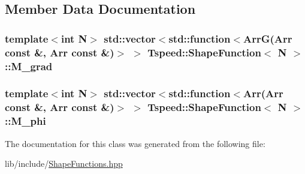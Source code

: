 \subsection{Member Data Documentation}
\hypertarget{classTspeed_1_1ShapeFunction_a282cf4ac589829f07a6c24e443d7bd05}{
\subsubsection[{M\-\_\-grad}]{\setlength{\rightskip}{0pt plus 5cm}template$<$int N$>$ std\-::vector$<$std\-::function$<$Arr\-G(Arr const \&, Arr const \&)$>$ $>$ {\bf Tspeed\-::\-Shape\-Function}$<$ N $>$\-::M\-\_\-grad\hspace{0.3cm}{\ttfamily [protected]}}}\label{classTspeed_1_1ShapeFunction_a282cf4ac589829f07a6c24e443d7bd05}
\hypertarget{classTspeed_1_1ShapeFunction_a6d8010d0c9d5e40f21f57c8201149ad5}{
\subsubsection[{M\-\_\-phi}]{\setlength{\rightskip}{0pt plus 5cm}template$<$int N$>$ std\-::vector$<$std\-::function$<$Arr(Arr const \&, Arr const \&)$>$ $>$ {\bf Tspeed\-::\-Shape\-Function}$<$ N $>$\-::M\-\_\-phi\hspace{0.3cm}{\ttfamily [protected]}}}\label{classTspeed_1_1ShapeFunction_a6d8010d0c9d5e40f21f57c8201149ad5}


The documentation for this class was generated from the following file\-:\begin{DoxyCompactItemize}
\item 
lib/include/\hyperlink{ShapeFunctions_8hpp}{Shape\-Functions.\-hpp}\end{DoxyCompactItemize}
